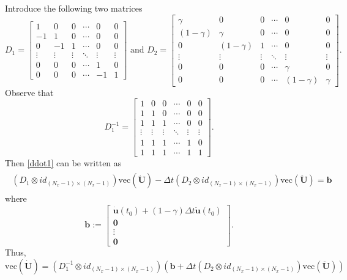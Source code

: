 \documentclass[a4paper, 10pt]{article}
\begin{document}



Introduce the following two matrices
$$
D_1 = \left[
\begin{array}{cccccc}
1 & 0 & 0 & \cdots & 0 & 0 \\
-1 & 1 & 0 & \cdots & 0 & 0 \\
0 & -1 & 1 & \cdots & 0 & 0 \\
\vdots & \vdots & \vdots & \ddots & \vdots & \vdots \\
0 & 0 & 0 & \cdots & 1 & 0 \\
0 & 0 & 0 & \cdots & -1 & 1  
\end{array}  
\right]
\text{ and } 
D_2 = \left[
\begin{array}{cccccc}
\gamma & 0 & 0 & \cdots & 0 & 0 \\
\left( 1-\gamma \right) & \gamma & 0 & \cdots & 0 & 0 \\
0 & \left( 1-\gamma\right) & 1 & \cdots & 0 & 0 \\
\vdots & \vdots & \vdots & \ddots & \vdots & \vdots \\
0 & 0 & 0 & \cdots & \gamma & 0 \\
0 & 0 & 0 & \cdots & \left(1-\gamma\right) & \gamma 
\end{array}  
\right].
$$
Observe that 
$$
D_1^{-1} = \left[
\begin{array}{cccccc}
1 & 0 & 0 & \cdots & 0 & 0 \\
1 & 1 & 0 & \cdots & 0 & 0 \\
1 & 1 & 1 & \cdots & 0 & 0 \\
\vdots & \vdots & \vdots & \ddots & \vdots & \vdots \\
1 & 1 & 1 & \cdots & 1 & 0 \\
1 & 1 & 1 & \cdots & 1 & 1  
\end{array}  
\right].
$$
Then \eqref{ddot1} can be written as
\begin{align}
\begin{array}{c}
\left( D_1 \otimes  id_{(N_x-1)\times(N_x-1)}\right) \mathrm{vec}(\dot{\mathbf{U}}) - \Delta t \left( D_2 \otimes  id_{(N_x-1)\times(N_x-1)}\right) \mathrm{vec}(\ddot{\mathbf{U}}) = \mathbf{b}
\end{array}\label{newmark2}
\end{align}
where
$$
\mathbf{b}:= \left[
\begin{array}{c}
\dot{\mathbf{u}}(t_0) + \left(1-\gamma\right)\Delta t\ddot{\mathbf{u}}(t_0) \\
\mathbf{0} \\
\vdots \\
\mathbf{0} 
\end{array}
\right].
$$
Thus,
$$
\mathrm{vec}(\dot{\mathbf{U}}) = \left( D_1^{-1} \otimes  id_{(N_x-1)\times(N_x-1)}\right)\left( \mathbf{b} +  \Delta t \left( D_2 \otimes  id_{(N_x-1)\times(N_x-1)}\right) \mathrm{vec}(\ddot{\mathbf{U}})\right)
$$
\end{document}

